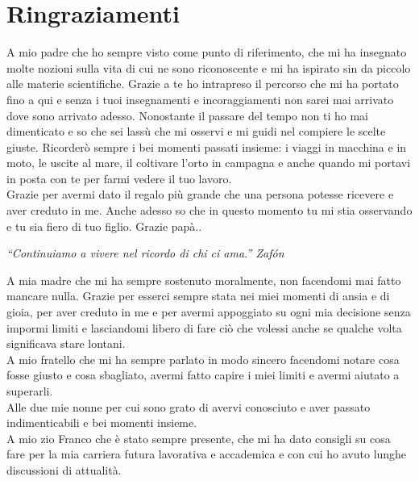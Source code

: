 
\chapter*{Ringraziamenti}
\thispagestyle{empty}

\vspace*{5\baselineskip}

A mio padre che ho sempre visto come punto di riferimento, che mi ha insegnato molte nozioni sulla vita di cui ne sono riconoscente e mi ha ispirato sin da piccolo alle materie scientifiche. Grazie a te ho intrapreso il percorso che mi ha portato fino a qui e senza i tuoi insegnamenti e incoraggiamenti non sarei mai arrivato dove sono arrivato adesso. Nonostante il passare del tempo non ti ho mai dimenticato e so che sei lassù che mi osservi e mi guidi nel compiere le scelte giuste. Ricorderò sempre i bei momenti passati insieme: i viaggi in macchina e in moto, le uscite al mare, il coltivare l'orto in campagna e anche quando mi portavi in posta con te per farmi vedere il tuo lavoro.\\
Grazie per avermi dato il regalo più grande che una persona potesse ricevere e aver creduto in me. Anche adesso so che in questo momento tu mi stia osservando e tu sia fiero di tuo figlio. Grazie papà..
\vspace{-4mm}
\begin{flushright}
    \emph{“Continuiamo a vivere nel ricordo di chi ci ama.” Zafón}
\end{flushright}

A mia madre che mi ha sempre sostenuto moralmente, non facendomi mai fatto mancare nulla. Grazie per esserci sempre stata nei miei momenti di ansia e di gioia, per aver creduto in me e per avermi appoggiato su ogni mia decisione senza impormi limiti e lasciandomi libero di fare ciò che volessi anche se qualche volta significava stare lontani.\\

A mio fratello che mi ha sempre parlato in modo sincero facendomi notare cosa fosse giusto e cosa sbagliato, avermi fatto capire i miei limiti e avermi aiutato a superarli.\\

Alle due mie nonne per cui sono grato di avervi conosciuto e aver passato indimenticabili e bei momenti insieme.\\

A mio zio Franco che è stato sempre presente, che mi ha dato consigli su cosa fare per la mia carriera futura lavorativa e accademica e con cui ho avuto lunghe discussioni di attualità.\\

